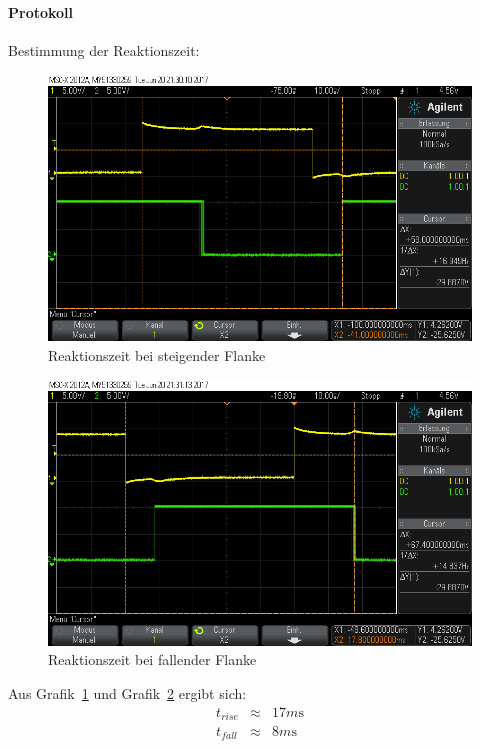 \documentclass[10pt]{scrreprt}
\begin{document}
    \paragraph{Protokoll}
    Bestimmung der Reaktionszeit:
    \begin{figure}[H]
        \centering
        \includegraphics[width=\textwidth]{scope_0.png}
        \caption{Reaktionszeit bei steigender Flanke}
        \label{fig:RisingEdgeRelais}
    \end{figure}



    \begin{figure}[H]
        \centering
        \includegraphics[width=\textwidth]{scope_1.png}
        \caption{Reaktionszeit bei fallender Flanke}
        \label{fig:FallingEdgeRelais}
    \end{figure}

    Aus Grafik~\ref{fig:RisingEdgeRelais} und Grafik~\ref{fig:FallingEdgeRelais}
    ergibt sich:
    \begin{eqnarray*}
        t_{rise} &\approx& 17\si{m\second}\\
        t_{fall} &\approx& 8\si{m\second}
    \end{eqnarray*}
\end{document}
